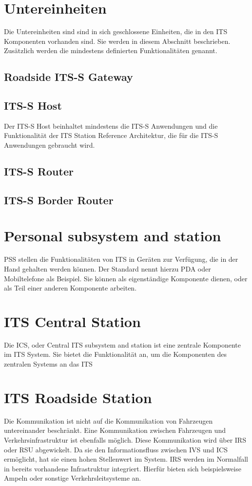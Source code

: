 \section{Untereinheiten}
Die Untereinheiten sind sind in sich geschlossene Einheiten, die in den \ac{ITS} Komponenten vorhanden sind. Sie werden in diesem Abschnitt beschrieben. Zusätzlich werden die mindestens definierten Funktionalitäten genannt.
  
\subsection{Roadside ITS-S Gateway}
\subsection{ITS-S Host}
Der ITS-S Host beinhaltet mindestens die ITS-S Anwendungen und die Funktionalität der ITS  Station Reference Architektur, die für die  ITS-S Anwendungen gebraucht wird. 


\subsection{ITS-S Router}
\subsection{ITS-S Border Router}

\section{Personal subsystem and station}
\ac{PSS} stellen die Funktionalitäten von \ac{ITS} in Geräten zur Verfügung, die in der Hand gehalten werden können. Der Standard nennt hierzu \ac{PDA} oder Mobiltelefone als Beispiel. Sie können als eigenständige Komponente dienen, oder als Teil einer anderen Komponente arbeiten.

\section{ITS Central Station}
Die \ac{ICS}, oder Central \ac{ITS} subsystem and station ist eine zentrale Komponente im \ac{ITS} System. Sie bietet die Funktionalität an, um die Komponenten des zentralen Systems an das \ac{ITS} 

\section{ITS Roadside Station}
Die Kommunikation ist nicht auf die Kommunikation von Fahrzeugen untereinander beschränkt. Eine Kommunikation zwischen Fahrzeugen und Verkehrsinfrastruktur ist ebenfalls möglich. Diese Kommunikation wird über \ac{IRS} oder \ac{RSU} abgewickelt. Da sie den Informationsfluss zwischen \ac{IVS} und \ac{ICS} ermöglicht, hat sie einen hohen Stellenwert im System. \ac{IRS} werden im Normalfall in bereits vorhandene Infrastruktur integriert. Hierfür bieten sich beispielsweise Ampeln oder sonstige Verkehrsleitsysteme an. 

